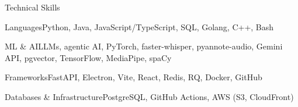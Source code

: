 \documentclass[
	11pt
]{../../../resume}
\begin{document}
	\begin{rSection}{T}{echnical Skills}
		\begin{rSet}{Languages}{Python, Java, JavaScript/TypeScript, SQL, Golang, C++, Bash}
		\end{rSet}
		\begin{rSet}{ML \& AI}{LLMs, agentic AI, PyTorch, faster-whisper, pyannote-audio, Gemini API, pgvector, TensorFlow, MediaPipe, spaCy}
		\end{rSet}
		\begin{rSet}{Frameworks}{FastAPI, Electron, Vite, React, Redis, RQ, Docker, GitHub}
		\end{rSet}
		\begin{rSet}{Databases \& Infrastructure}{PostgreSQL, GitHub Actions, AWS (S3, CloudFront)}
		\end{rSet}
	\end{rSection}
\end{document}
